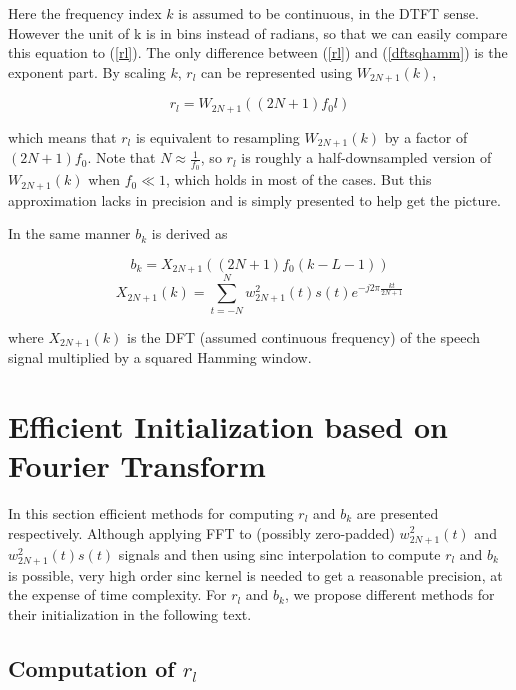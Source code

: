 \documentclass[dvips]{article}
\begin{document}
Here the frequency index $k$ is assumed to be continuous, in the DTFT sense. However the unit of k is in bins instead of radians, so that we can easily compare this equation to (\ref{rl}). The only difference between (\ref{rl}) and (\ref{dftsqhamm}) is the exponent part. By scaling $k$, $r_l$ can be represented using $W_{2N + 1}(k)$,

\begin{equation} \label{rl-to-dft}
r_l = W_{2N + 1}\left((2N + 1)f_0l\right)
\end{equation}

which means that $r_l$ is equivalent to resampling $W_{2N + 1}(k)$ by a factor of $(2N + 1)f_0$. Note that $N \approx \frac{1}{f_0}$, so $r_l$ is roughly a half-downsampled version of $W_{2N + 1}(k)$ when $f_0 \ll 1$, which holds in most of the cases. But this approximation lacks in precision and is simply presented to help get the picture.

In the same manner $b_k$ is derived as

\begin{equation} \label{bk-to-dft}
b_k = X_{2N + 1}\left((2N + 1)f_0(k - L - 1)\right)
\end{equation}
\begin{equation} \label{bk-to-dft}
X_{2N + 1}(k) = \sum_{t = -N}^{N} w^2_{2N + 1}(t)s(t) e^{-j 2\pi \frac{kt}{2N + 1}}
\end{equation}

where $X_{2N + 1}(k)$ is the DFT (assumed continuous frequency) of the speech signal multiplied by a squared Hamming window.

\section{Efficient Initialization based on Fourier Transform}

In this section efficient methods for computing $r_l$ and $b_k$ are presented respectively. Although applying FFT to (possibly zero-padded) $w^2_{2N + 1}(t)$ and $w^2_{2N + 1}(t)s(t)$ signals and then using sinc interpolation to compute $r_l$ and $b_k$ is possible, very high order sinc kernel is needed to get a reasonable precision, at the expense of time complexity. For $r_l$ and $b_k$, we propose different methods for their initialization in the following text.

\subsection{Computation of $r_l$}
\end{document}
